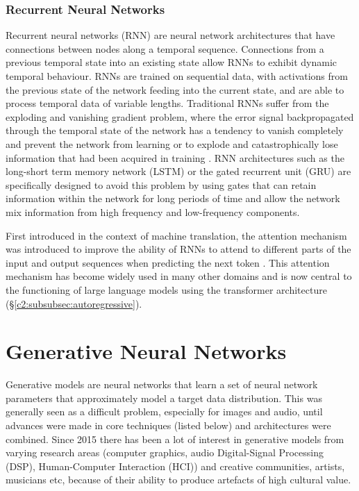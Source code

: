 \subsubsection{Recurrent Neural Networks}
\label{c2:subsubsec:rnn}

Recurrent neural networks (RNN) are neural network architectures that have connections between nodes along a temporal sequence. 
Connections from a previous temporal state into an existing state allow RNNs to exhibit dynamic temporal behaviour. RNNs are trained on sequential data, with activations from the previous state of the network feeding into the current state, and are able to process temporal data of variable lengths. 
Traditional RNNs suffer from the exploding and vanishing gradient problem, where the error signal backpropagated through the temporal state of the network has a tendency to vanish completely and prevent the network from learning or to explode and catastrophically lose information that had been acquired in training \citep{hochreiter1998vanishing}. 
RNN architectures such as the long-short term memory network (LSTM) \citep{hochreiter1997long} or the gated recurrent unit (GRU) \citep{cho2014properties} are specifically designed to avoid this problem by using gates that can retain information within the network for long periods of time and allow the network mix information from high frequency and low-frequency components. 

First introduced in the context of machine translation, the attention mechanism was introduced to improve the ability of RNNs to attend to different parts of the input and output sequences when predicting the next token \citep{bahdanau2014neural}. 
This attention mechanism has become widely used in many other domains and is now central to the functioning of large language models using the transformer architecture (\S \ref{c2:subsubsec:autoregressive}).

 
\section{Generative Neural Networks}
\label{c2:sec:gen-nn}

Generative models are neural networks that learn a set of neural network parameters that approximately model a target data distribution. 
This was generally seen as a difficult problem, especially for images and audio, until advances were made in core techniques (listed below) and architectures were combined. 
Since 2015 there has been a lot of interest in generative models from varying research areas (computer graphics, audio Digital-Signal Processing (DSP), Human-Computer Interaction (HCI)) and creative communities, artists, musicians etc, because of their ability to produce artefacts of high cultural value. 

